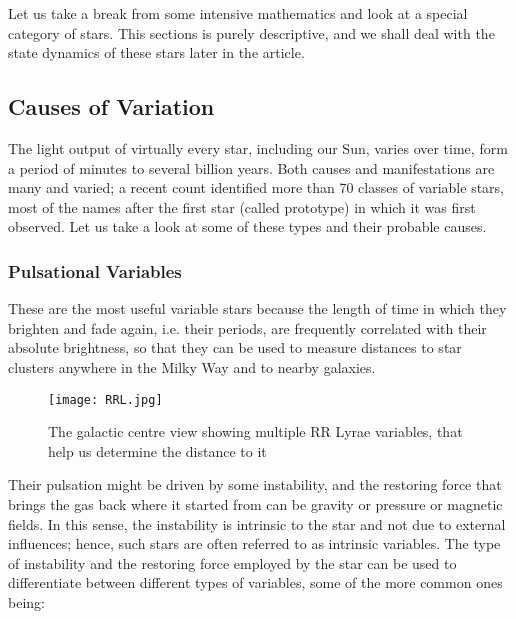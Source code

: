 Let us take a break from some intensive mathematics and look at a special category of stars. This sections is purely descriptive, and we shall deal with the state dynamics of these stars later in the article.
\subsection{Causes of Variation}
The light output of virtually every star, including our Sun, varies over time, form a period of minutes to several billion years. Both causes and manifestations are many and varied; a recent count identified more than 70 classes of variable stars, most of the names after the first star (called prototype) in which it was first observed. Let us take a look at some of these types and their probable causes.
\subsubsection{Pulsational Variables}
These are the most useful variable stars because the length of time in which they brighten and fade again, i.e. their periods, are frequently correlated with their absolute brightness, so that they can be used to measure distances to star clusters anywhere in the Milky Way and to nearby galaxies.
\begin{figure}[H]
    \centering
    \color{white}
    \texttt{[image: RRL.jpg]}
    \caption{The galactic centre view showing multiple RR Lyrae variables, that help us determine the distance to it}
    \label{fig:my_label}
\end{figure}
\noindent
Their pulsation might be driven by some instability, and the restoring force that brings the gas back where it started from can be gravity or pressure or magnetic fields. In this sense, the instability is intrinsic to the star and not due to external influences; hence, such stars are often referred to as intrinsic variables. The type of instability and the restoring force employed by the star can be used to differentiate between different types of variables, some of the more common ones being:

